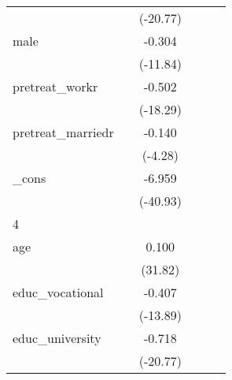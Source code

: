 {\begin{tabular}{l*{5}{c}}
            &                     &    (-20.77)         &                     &                     &                     \\
[1em]
male        &                     &      -0.304\sym{***}&                     &                     &                     \\
            &                     &    (-11.84)         &                     &                     &                     \\
[1em]
pretreat\_workr&                     &      -0.502\sym{***}&                     &                     &                     \\
            &                     &    (-18.29)         &                     &                     &                     \\
[1em]
pretreat\_marriedr&                     &      -0.140\sym{***}&                     &                     &                     \\
            &                     &     (-4.28)         &                     &                     &                     \\
[1em]
\_cons      &                     &      -6.959\sym{***}&                     &                     &                     \\
            &                     &    (-40.93)         &                     &                     &                     \\
\hline
4           &                     &                     &                     &                     &                     \\
age         &                     &       0.100\sym{***}&                     &                     &                     \\
            &                     &     (31.82)         &                     &                     &                     \\
[1em]
educ\_vocational&                     &      -0.407\sym{***}&                     &                     &                     \\
            &                     &    (-13.89)         &                     &                     &                     \\
[1em]
educ\_university&                     &      -0.718\sym{***}&                     &                     &                     \\
            &                     &    (-20.77)         &                     &                     &                     \\

\end{tabular}}
